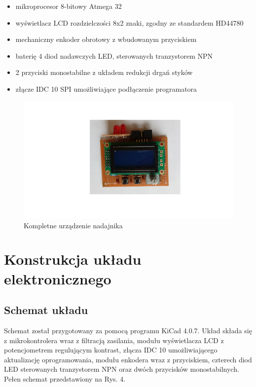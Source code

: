 \documentclass{article}
\begin{document}
\begin{itemize}
	\item	mikroprocesor 8-bitowy Atmega 32

	\item	wyświetlacz LCD rozdzielczości 8x2 znaki, zgodny ze standardem HD44780

	\item	mechaniczny enkoder obrotowy z wbudowanym przyciskiem

	\item	baterię 4 diod nadawczych LED, sterowanych tranzystorem NPN

	\item	2 przyciski monostabilne z układem redukcji drgań styków

	\item 	złącze IDC 10 SPI umożliwiające podłączenie programatora
\end{itemize}

\begin{figure}[h!]
	\includegraphics[width=\textwidth]{img/morse_main_view.png}
	\caption{Kompletne urządzenie nadajnika}
	\label{fig:zdjecie1}
\end{figure}

\newpage
\section{Konstrukcja układu elektronicznego}
\subsection{Schemat układu}
Schemat został przygotowany za pomocą programu KiCad 4.0.7. Układ składa się z mikrokontrolera wraz z filtracją zasilania, modułu wyświetlacza LCD z potencjometrem regulującym kontrast, złącza IDC 10 umożliwiającego aktualizację oprogramowania, modułu enkodera wraz z przyciskiem, czterech diod LED sterowanych tranzystorem NPN oraz dwóch przycisków monostabilnych. Pełen schemat przedstawiony na Rys. 4.
\end{document}
